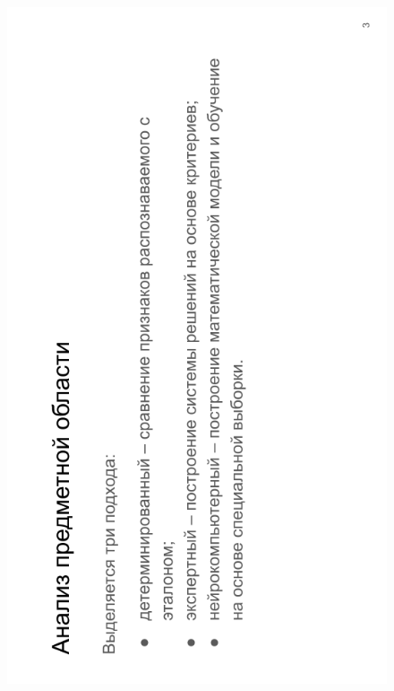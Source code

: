 \begin{figure}[H]
	\begin{center}
		\includegraphics[scale=0.7]{inc/img/slide3.png}
	\end{center}
\end{figure}
